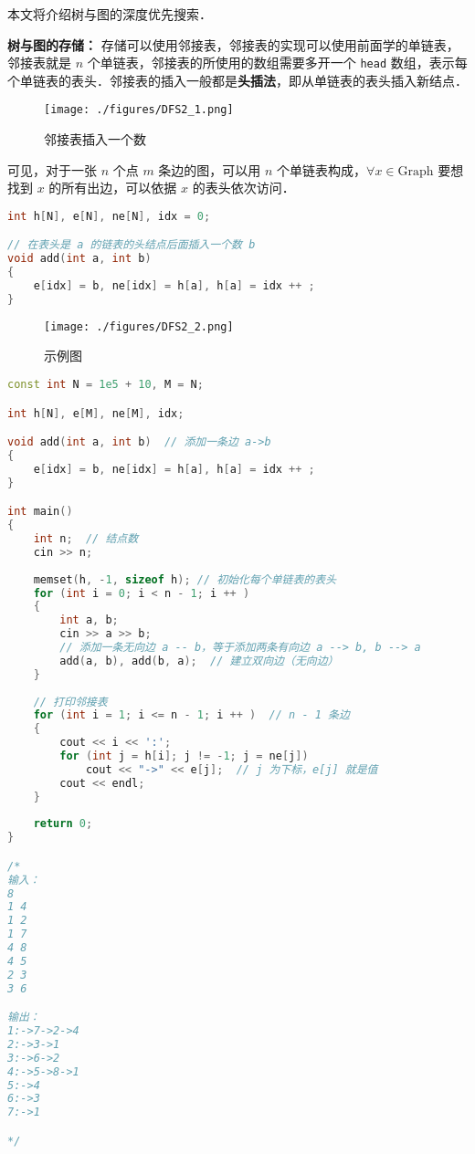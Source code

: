 本文将介绍树与图的深度优先搜索．

\textbf{树与图的存储：}
存储可以使用邻接表，邻接表的实现可以使用前面学的单链表，邻接表就是 $n$ 个单链表，邻接表的所使用的数组需要多开一个 \verb|head| 数组，表示每个单链表的表头．邻接表的插入一般都是\textbf{头插法}，即从单链表的表头插入新结点．

\begin{figure}[ht]
\centering
\texttt{[image: ./figures/DFS2\_1.png]}
\caption{邻接表插入一个数} \label{DFS2_fig1}
\end{figure}

可见，对于一张 $n$ 个点 $m$ 条边的图，可以用 $n$ 个单链表构成，$\forall x\in \text{Graph}$ 要想找到 $x$ 的所有出边，可以依据 $x$ 的表头依次访问．

\begin{lstlisting}[language=cpp]
int h[N], e[N], ne[N], idx = 0;

// 在表头是 a 的链表的头结点后面插入一个数 b
void add(int a, int b)
{
    e[idx] = b, ne[idx] = h[a], h[a] = idx ++ ;
}
\end{lstlisting}

\begin{figure}[ht]
\centering
\texttt{[image: ./figures/DFS2\_2.png]}
\caption{示例图} \label{DFS2_fig2}
\end{figure}

\begin{lstlisting}[language=cpp]
const int N = 1e5 + 10, M = N;

int h[N], e[M], ne[M], idx;

void add(int a, int b)  // 添加一条边 a->b
{
    e[idx] = b, ne[idx] = h[a], h[a] = idx ++ ;
}

int main()
{
    int n;  // 结点数
    cin >> n;
    
    memset(h, -1, sizeof h); // 初始化每个单链表的表头
    for (int i = 0; i < n - 1; i ++ )
    {
        int a, b;
        cin >> a >> b;
        // 添加一条无向边 a -- b，等于添加两条有向边 a --> b, b --> a
        add(a, b), add(b, a);  // 建立双向边（无向边）
    }
    
    // 打印邻接表
    for (int i = 1; i <= n - 1; i ++ )  // n - 1 条边
    {
        cout << i << ':';
        for (int j = h[i]; j != -1; j = ne[j])
            cout << "->" << e[j];  // j 为下标，e[j] 就是值
        cout << endl;
    }
    
    return 0;
}

/*
输入：
8
1 4
1 2
1 7
4 8
4 5
2 3
3 6

输出：
1:->7->2->4
2:->3->1
3:->6->2
4:->5->8->1
5:->4
6:->3
7:->1

*/
\end{lstlisting}

